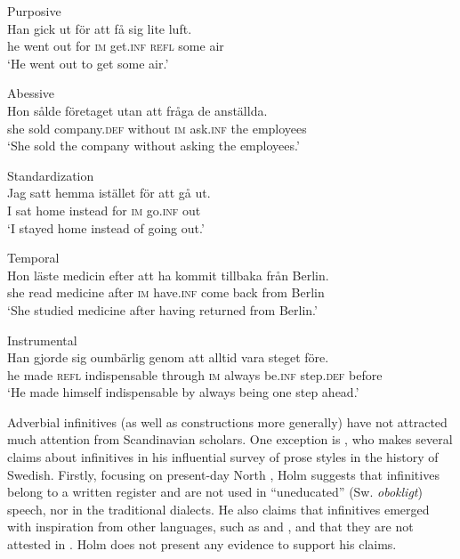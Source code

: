 \documentclass[output=paper]{langscibook}
\begin{document}
\ea
\label{ex:kalm:1}
\ea {}Purposive\label{ex:kalm:1a}\\
\gll Han gick ut för att få sig lite luft.\\
he went out for \textsc{im} get.\textsc{inf} \textsc{refl} some air\\
\glt ‘He went out to get some air.’

\ex {}Abessive\label{ex:kalm:1b}\\
\gll Hon sålde företaget utan att fråga de anställda.\\
she sold company.\textsc{def} without \textsc{im} ask.\textsc{inf} the employees\\
\glt ‘She sold the company without asking the employees.’

\ex {}Standardization\label{ex:kalm:1c}\\
\gll Jag satt hemma istället för att gå ut.\\
I sat home instead for \textsc{im} go.\textsc{inf} out\\
\glt‘I stayed home instead of going out.’

\ex Temporal\label{ex:kalm:1d}\\
\gll Hon läste medicin efter att ha kommit tillbaka från Berlin.\\
she read medicine after \textsc{im} have.\textsc{inf} come back from Berlin\\
\glt ‘She studied medicine after having returned from Berlin.’

\ex Instrumental\label{ex:kalm:1e}\\
\gll Han gjorde sig oumbärlig genom att alltid vara steget före.\\
he made \textsc{refl} indispensable through \textsc{im} always be.\textsc{inf} step.\textsc{def} before\\
\glt ‘He made himself indispensable by always being one step ahead.’
\z
\z

Adverbial infinitives (as well as  constructions more generally) have not attracted much attention from Scandinavian scholars. One exception is \citet{Holm1967}, who makes several claims about  infinitives in his influential survey of prose styles in the history of Swedish. Firstly, focusing on present-day North , Holm suggests that  infinitives belong to a written register and are not used in “uneducated” (Sw. \textit{obokligt}) speech, nor in the traditional dialects. He also claims that  infinitives emerged with inspiration from other languages, such as  and , and that they are not attested in  \citep[27]{Holm1967}. Holm does not present any evidence to support his claims. 
\end{document}
